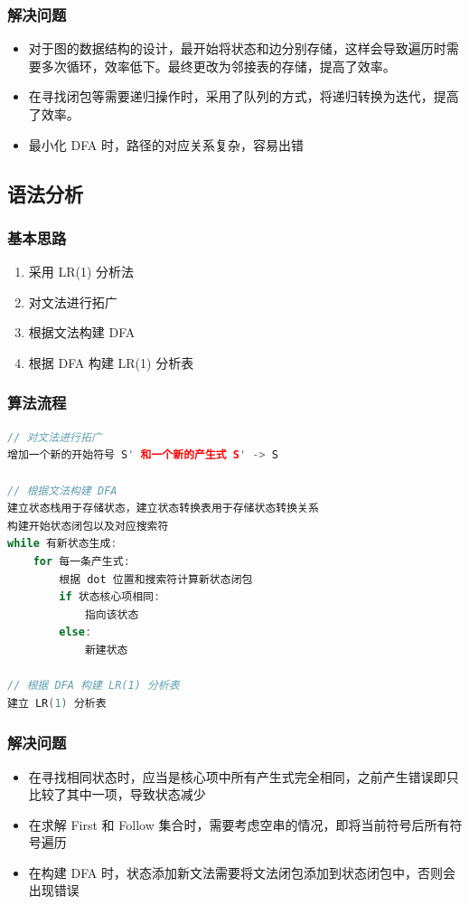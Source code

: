 \documentclass[cs4size,a4paper]{ctexart}
\begin{document}
\subsubsection{解决问题}
\begin{itemize}
    \item 对于图的数据结构的设计，最开始将状态和边分别存储，这样会导致遍历时需要多次循环，效率低下。最终更改为邻接表的存储，提高了效率。
    \item 在寻找闭包等需要递归操作时，采用了队列的方式，将递归转换为迭代，提高了效率。
    \item 最小化 DFA 时，路径的对应关系复杂，容易出错
\end{itemize}
\subsection{语法分析}
\subsubsection{基本思路}
\begin{enumerate}
    \item 采用 LR(1) 分析法
    \item 对文法进行拓广
    \item 根据文法构建 DFA 
    \item 根据 DFA 构建 LR(1) 分析表
\end{enumerate}
\subsubsection{算法流程}
\begin{lstlisting}[language=c++]
// 对文法进行拓广
增加一个新的开始符号 S' 和一个新的产生式 S' -> S

// 根据文法构建 DFA
建立状态栈用于存储状态，建立状态转换表用于存储状态转换关系
构建开始状态闭包以及对应搜索符
while 有新状态生成:
    for 每一条产生式:
        根据 dot 位置和搜索符计算新状态闭包
        if 状态核心项相同:
            指向该状态
        else:
            新建状态

// 根据 DFA 构建 LR(1) 分析表
建立 LR(1) 分析表
\end{lstlisting}
\subsubsection{解决问题}
\begin{itemize}
    \item 在寻找相同状态时，应当是核心项中所有产生式完全相同，之前产生错误即只比较了其中一项，导致状态减少
    \item 在求解 First 和 Follow 集合时，需要考虑空串的情况，即将当前符号后所有符号遍历
    \item 在构建 DFA 时，状态添加新文法需要将文法闭包添加到状态闭包中，否则会出现错误
\end{itemize}
\end{document}
